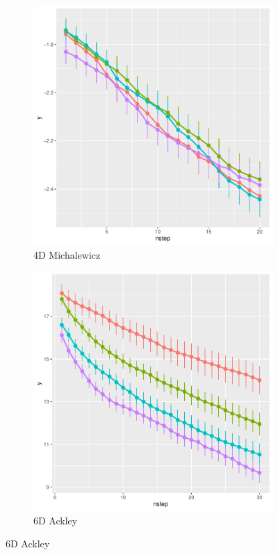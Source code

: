 \documentclass [PhD] {package/uclathes}
\begin{document}
\begin{figure}
\begin{subfigure}[b]{0.3\textwidth}
\end{subfigure}
\begin{subfigure}[b]{0.3\textwidth}
\centering
\caption{4D Michalewicz}
\includegraphics[width=\textwidth]{chapters/EGO/pdfs/michal_lineplot}
\end{subfigure}
\begin{subfigure}[b]{0.3\textwidth}
\centering
\caption{6D Ackley}
\includegraphics[width=\textwidth]{chapters/EGO/pdfs/ackley6_lineplot}

\end{subfigure}
\end{figure}
\end{document}

